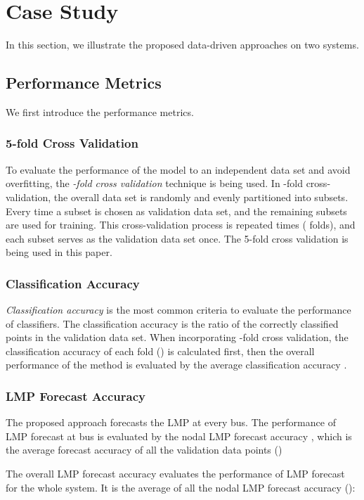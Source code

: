 \documentclass[letterpaper, 11pt]{article}
\theoremstyle{plain}
\theoremstyle{definition}
\begin{document}
\section{Case Study} \label{sec:case_study}
In this section, we illustrate the proposed data-driven approaches on two systems.
\subsection{Performance Metrics} \label{sub:performance_measurements}
We first introduce the performance metrics.
\subsubsection{5-fold Cross Validation} \label{ssub:cross_validation}
To evaluate the performance of the model to an independent data set and avoid overfitting, the \emph{-fold cross validation} technique is being used.
In -fold cross-validation, the overall data set is randomly and evenly partitioned into  subsets. Every time a subset is chosen as validation data set, and the remaining  subsets are used for training. This cross-validation process is repeated  times ( folds), and each subset serves as the validation data set once.
The 5-fold cross validation is being used in this paper.



\subsubsection{Classification Accuracy} \label{ssub:classification_accuracy_eval}
\emph{Classification accuracy} is the most common criteria to evaluate the performance of classifiers. The classification accuracy  is the ratio of the correctly classified points in the validation data set.
When incorporating -fold cross validation, the classification accuracy of each fold () is calculated first, then the overall performance of the method is evaluated by the average classification accuracy 
.


\subsubsection{LMP Forecast Accuracy} \label{ssub:lmp_forecast_accuracy}
The proposed approach forecasts the LMP at every bus. The performance of LMP forecast at bus  is evaluated by the nodal LMP forecast accuracy , which is the average forecast accuracy of all the validation data points ()

The overall LMP forecast accuracy  evaluates the performance of LMP forecast for the whole system. It is the average of all the nodal LMP forecast accuracy  ():
\end{document}
